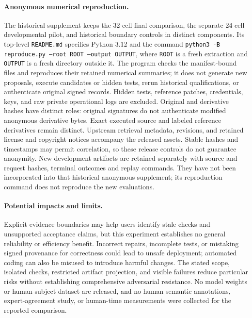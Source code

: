 \paragraph{Anonymous numerical reproduction.}
The historical supplement keeps the 32-cell final comparison, the separate
24-cell developmental pilot, and historical boundary controls in distinct
components. Its top-level \texttt{README.md} specifies Python 3.12 and the
command \texttt{python3 -B reproduce.py --root ROOT --output OUTPUT}, where
\texttt{ROOT} is a fresh extraction and \texttt{OUTPUT} is a fresh directory
outside it. The program checks the manifest-bound files and reproduces their
retained numerical summaries; it does not generate new proposals, execute
candidates or hidden tests, rerun historical qualifications, or authenticate
original signed records. Hidden tests, reference patches, credentials, keys,
and raw private operational logs are excluded. Original and derivative hashes
have distinct roles: original signatures do not authenticate modified anonymous
derivative bytes. Exact executed source and labeled reference derivatives remain
distinct. Upstream retrieval metadata, revisions, and retained license and
copyright notices accompany the released assets. Stable hashes and timestamps
may permit correlation, so these release controls do not guarantee anonymity.
New development artifacts are retained separately with source and request
hashes, terminal outcomes and replay commands. They have not been incorporated
into that historical anonymous supplement; its reproduction command does not
reproduce the new evaluations.

\paragraph{Potential impacts and limits.}
Explicit evidence boundaries may help users identify stale checks and
unsupported acceptance claims, but this experiment establishes no general
reliability or efficiency benefit. Incorrect repairs, incomplete tests, or
mistaking signed provenance for correctness could lead to unsafe deployment;
automated coding can also be misused to introduce harmful changes. The stated
scope, isolated checks, restricted artifact projection, and visible failures
reduce particular risks without establishing comprehensive adversarial
resistance. No model weights or human-subject dataset are released, and no
human semantic annotations, expert-agreement study, or human-time measurements
were collected for the reported comparison. 
